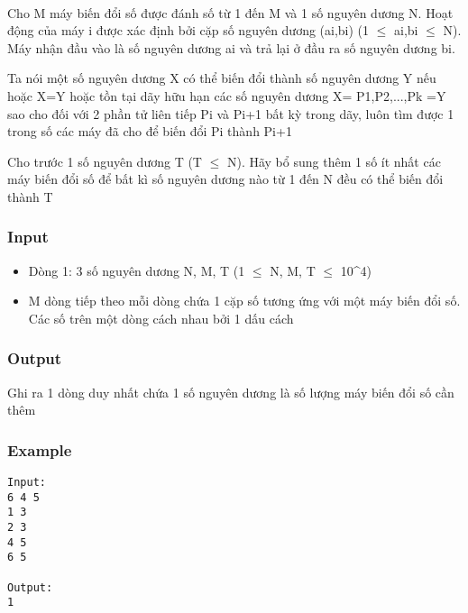 

 

Cho M máy biến đổi số được đánh số từ 1 đến M và 1 số nguyên dương N. Hoạt động của máy i được xác định bởi cặp số nguyên dương (ai,bi) (1 $\le$ ai,bi $\le$ N). Máy nhận đầu vào là số nguyên dương ai và trả lại ở đầu ra số nguyên dương bi.

Ta nói một số nguyên dương X có thể biến đổi thành số nguyên dương Y nếu hoặc X=Y hoặc tồn tại dãy hữu hạn các số nguyên dương X= P1,P2,...,Pk =Y sao cho đối với 2 phần tử liên tiếp Pi và Pi+1 bất kỳ trong dãy, luôn tìm được 1 trong số các máy đã cho để biến đổi Pi thành Pi+1

Cho trước 1 số nguyên dương T (T  $\le$  N). Hãy bổ sung thêm 1 số ít nhất các máy biến đổi số để bất kì số nguyên dương nào từ 1 đến N đều có thể biến đổi thành T

\subsubsection{Input}
\begin{itemize}
	\item Dòng 1: 3 số nguyên dương N, M, T (1  $\le$  N, M, T  $\le$  10^4)
	\item M dòng tiếp theo mỗi dòng chứa 1 cặp số tương ứng với một máy biến đổi số. Các số trên một dòng cách nhau bởi 1 dấu cách
\end{itemize}

\subsubsection{Output}

Ghi ra 1 dòng duy nhất chứa 1 số nguyên dương là số lượng máy biến đổi số cần thêm

\subsubsection{Example}
\begin{verbatim}
Input:
6 4 5
1 3
2 3
4 5
6 5

Output:
1
\end{verbatim}
